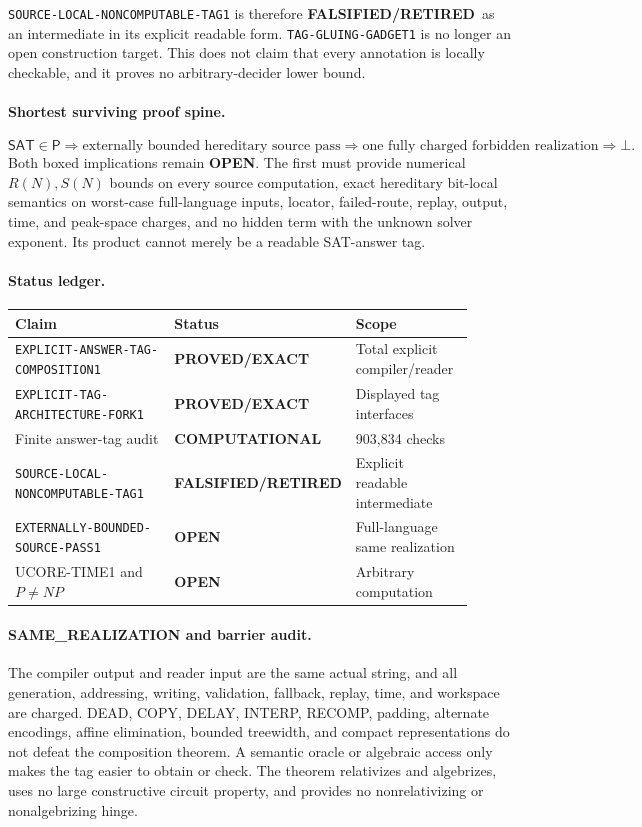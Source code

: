 \documentclass[11pt]{article}
\newcommand{\statusproved}{\textcolor{proved}{\textbf{PROVED/EXACT}}}
\newcommand{\statusopen}{\textcolor{openstatus}{\textbf{OPEN}}}
\newcommand{\statusretired}{\textcolor{retired}{\textbf{FALSIFIED/RETIRED}}}
\begin{document}
\texttt{SOURCE-LOCAL-NONCOMPUTABLE-TAG1} is therefore
\statusretired\ as an intermediate in its explicit readable form.
\texttt{TAG-GLUING-GADGET1} is no longer an open construction target.
This does not claim that every annotation is locally checkable, and it proves
no arbitrary-decider lower bound.

\paragraph{Shortest surviving proof spine.}
\[
\mathsf{SAT}\in\mathsf P
\Longrightarrow
\boxed{\text{externally bounded hereditary source pass}}
\Longrightarrow
\boxed{\text{one fully charged forbidden realization}}
\Longrightarrow\bot .
\]
Both boxed implications remain \statusopen. The first must provide numerical
$R(N),S(N)$ bounds on every source computation, exact hereditary bit-local
semantics on worst-case full-language inputs, locator, failed-route, replay,
output, time, and peak-space charges, and no hidden term with the unknown
solver exponent. Its product cannot merely be a readable SAT-answer tag.

\paragraph{Status ledger.}
\begin{center}\small
\begin{tabular}{p{0.44\linewidth}p{0.20\linewidth}p{0.27\linewidth}}
\toprule
Claim & Status & Scope\\ \midrule
\texttt{EXPLICIT-ANSWER-TAG-COMPOSITION1} & \statusproved & Total explicit compiler/reader\\
\texttt{EXPLICIT-TAG-ARCHITECTURE-FORK1} & \statusproved & Displayed tag interfaces\\
Finite answer-tag audit & \textbf{COMPUTATIONAL} & 903,834 checks\\
\texttt{SOURCE-LOCAL-NONCOMPUTABLE-TAG1} & \statusretired & Explicit readable intermediate\\
\texttt{EXTERNALLY-BOUNDED-SOURCE-PASS1} & \statusopen & Full-language same realization\\
UCORE-TIME1 and $P\ne NP$ & \statusopen & Arbitrary computation\\
\bottomrule
\end{tabular}
\end{center}

\paragraph{SAME\_REALIZATION and barrier audit.}
The compiler output and reader input are the same actual string, and all
generation, addressing, writing, validation, fallback, replay, time, and
workspace are charged. DEAD, COPY, DELAY, INTERP, RECOMP, padding, alternate
encodings, affine elimination, bounded treewidth, and compact representations
do not defeat the composition theorem. A semantic oracle or algebraic access
only makes the tag easier to obtain or check. The theorem relativizes and
algebrizes, uses no large constructive circuit property, and provides no
nonrelativizing or nonalgebrizing hinge.
\end{document}
